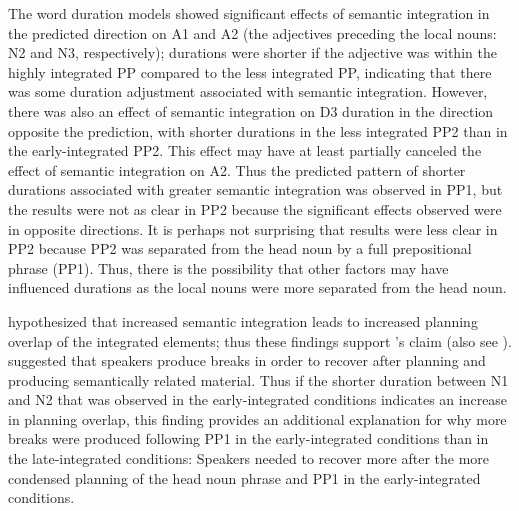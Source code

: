 \documentclass[12pt,titlepage]{article}
\begin{document}


The word duration models showed significant effects of semantic integration in the predicted direction on A1 and A2 (the adjectives preceding the local nouns: N2 and N3, respectively); durations were shorter if the adjective was within the highly integrated PP compared to the less integrated PP, indicating that there was some duration adjustment associated with semantic integration. However, there was also an effect of semantic integration on D3 duration in the direction opposite the prediction, with shorter durations in the less integrated PP2 than in the early-integrated PP2. This effect may have at least partially canceled the effect of semantic integration on A2. Thus the predicted pattern of shorter durations associated with greater semantic integration was observed in PP1, but the results were not as clear in PP2 because the significant effects observed were in opposite directions. It is perhaps not surprising that results were less clear in PP2 because PP2 was separated from the head noun by a full prepositional phrase (PP1). Thus, there is the possibility that other factors may have influenced durations as the local nouns were more separated from the head noun.

 hypothesized that increased semantic integration leads to increased planning overlap of the integrated elements; thus these findings support \citeauthor{SolomonPearlmutter04}'s claim (also see ).  suggested that speakers produce breaks in order to recover after planning and producing semantically related material. Thus if the shorter duration between N1 and N2 that was observed in the early-integrated conditions indicates an increase in planning overlap, this finding provides an additional explanation for why more breaks were produced following PP1 in the early-integrated conditions than in the late-integrated conditions: Speakers needed to recover more after the more condensed planning of the head noun phrase and PP1 in the early-integrated conditions.




\end{document}
